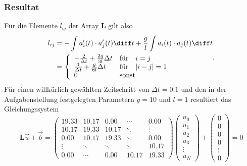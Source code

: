 \subsubsection{Resultat}
Für die Elemente $l_{ij}$ der Array $\mathbf{L}$ gilt also
\begin{equation}
    \begin{aligned}
        l_{ij} 
        &= - \int a_i'(t) \cdot a_j'(t) \diff t + \frac{g}{l} \int a_i(t) \cdot a_j(t) \diff t \\
        &=  \left\{ 
                \begin{array}{ll}
                    - \frac{2}{\Delta t} + \frac{2g}{3l} \Delta t & \text{für} \quad i = j \\
                    \frac{1}{\Delta t} + \frac{g}{6l} \Delta t & \text{für} \quad |i - j| = 1 \\
                    0 & \text{sonst}
                \end{array} 
            \right.
    \end{aligned}.
\end{equation}
Für einen willkürlich gewählten Zeitschritt von $\Delta t = 0.1$ und den in der Aufgabenstellung festgelegten Parametern $g = 10$ und $l = 1$ resultiert das Gleichungssystem
\begin{equation}
    \mathbf{L}\vec{u} + \vec{b} 
    = \left(\begin{matrix}
        19.33  & 10.17  &  0.00  & \cdots &  0.00  \\
        10.17  & 19.33  & 10.17  & \ddots & \vdots \\
         0.00  & 10.17  & 19.33  & \ddots &  0.00  \\
        \vdots & \ddots & \ddots & \ddots & 10.17  \\
         0.00  & \cdots & 0.00   & 10.17  & 19.33
    \end{matrix}\right)
    \left(\begin{matrix}
        u_0 \\ u_1 \\ u_2 \\ u_3 \\ \vdots \\ u_N
    \end{matrix}\right)
    +
    \left(\begin{matrix}
        0 \\ 0 \\ 0 \\ 0 \\ \vdots \\ 0
    \end{matrix}\right)
    = 0
\end{equation}


